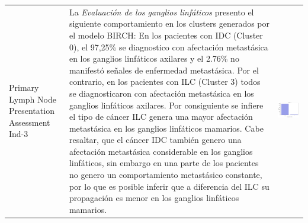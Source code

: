 \begin{table}[htb!]
	\footnotesize
	\begin{threeparttable}
		\begin{tabular}{p{2.5cm} p{7cm} p{6.5cm}} \toprule
			Primary Lymph Node Presentation Assessment Ind-3
			& La \textit{Evaluación de los ganglios linfáticos} presento el siguiente comportamiento en los clusters generados por el modelo BIRCH: En los pacientes con IDC (Cluster 0), el 97,25\% se diagnostico con afectación metastásica en los ganglios linfáticos axilares y el 2.76\% no manifestó señales de enfermedad metastásica. Por el contrario, en los pacientes con ILC (Cluster 3) todos se diagnosticaron con afectación metastásica en los ganglios linfáticos axilares. Por consiguiente se infiere el tipo de cáncer ILC genera una mayor afectación metastásica en los ganglios linfáticos mamarios. Cabe resaltar, que el cáncer IDC también genero una afectación metastásica considerable en los ganglios linfáticos, sin embargo en una parte de los pacientes no genero un comportamiento metastásico constante, por lo que es posible inferir que a diferencia del ILC su propagación es menor en los ganglios linfáticos mamarios. 
			& 
			\begin{center}\includegraphics[width=1\linewidth]{NOTEBOOK/IMAGENES_BIRCH_CLUSTERING/6_Cluster_0_lymph_presentation}\end{center}

\end{tabular}
\end{threeparttable}
\end{table}
